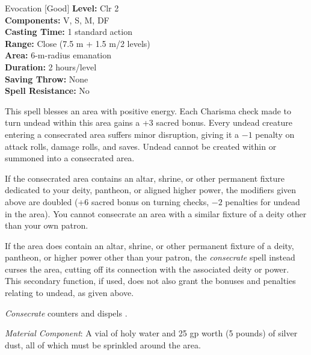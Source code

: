 {Evocation [Good]}
{
	\textbf{Level:}
	Clr 2\\
	\textbf{Components:}
	V, S, M, DF\\
	\textbf{Casting Time:}
	1 standard action\\
	\textbf{Range:}
	Close (7.5 m + 1.5 m/2 levels)\\
	\textbf{Area:}
	6-m-radius emanation\\
	\textbf{Duration:}
	2 hours/level\\
	\textbf{Saving Throw:}
	None\\
	\textbf{Spell Resistance:}
	No\\
}
{
	This spell blesses an area with positive energy. Each Charisma check made to turn undead within this area gains a +3 sacred bonus. Every undead creature entering a consecrated area suffers minor disruption, giving it a $-1$ penalty on attack rolls, damage rolls, and saves. Undead cannot be created within or summoned into a consecrated area.

	If the consecrated area contains an altar, shrine, or other permanent fixture dedicated to your deity, pantheon, or aligned higher power, the modifiers given above are doubled (+6 sacred bonus on turning checks, $-2$ penalties for undead in the area). You cannot consecrate an area with a similar fixture of a deity other than your own patron.

	If the area does contain an altar, shrine, or other permanent fixture of a deity, pantheon, or higher power other than your patron, the \emph{consecrate} spell instead curses the area, cutting off its connection with the associated deity or power. This secondary function, if used, does not also grant the bonuses and penalties relating to undead, as given above.

	\emph{Consecrate} counters and dispels .

	\textit{Material Component}:
	A vial of holy water and 25 gp worth (5 pounds) of silver dust, all of which must be sprinkled around the area.

}
